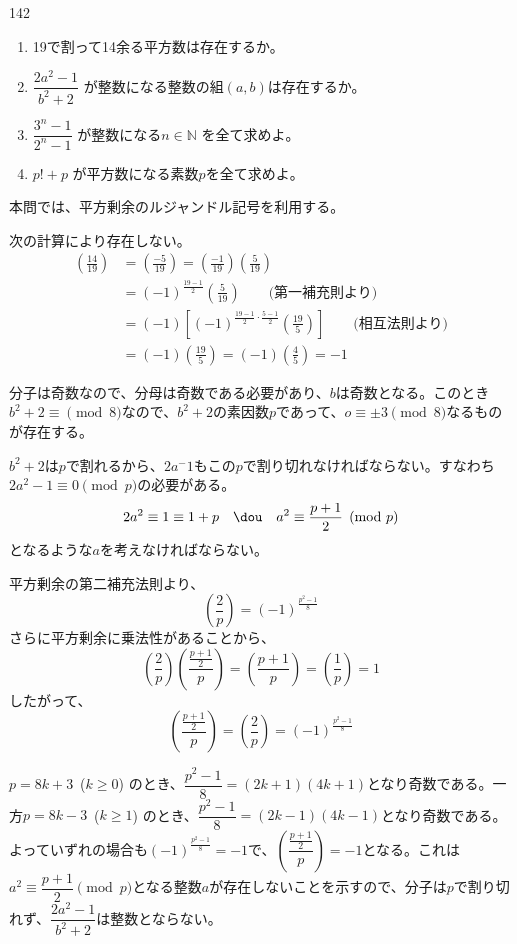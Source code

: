 \begin{thm}{142}{}{}
 \begin{enumerate}
  \item 19で割って14余る平方数は存在するか。 
  \item $\dfrac{2a^2-1}{b^2+2}$ が整数になる整数の組$(a,b)$は存在するか。 
  \item $\dfrac{3^n-1}{2^n-1}$ が整数になる$n\in\mathbb{N}$ を全て求めよ。 
  \item $p!+p$ が平方数になる素数$p$を全て求めよ。 
 \end{enumerate}
\end{thm}

本問では、平方剰余のルジャンドル記号を利用する。

次の計算により存在しない。
\begin{align*}
 \left(\frac{14}{19}\right) &= \left(\frac{-5}{19}\right) = \left(\frac{-1}{19}\right)\left(\frac{5}{19}\right) \\
 &= (-1)^{\frac{19-1}{2}}\left(\frac{5}{19}\right) \quad\quad\text{(第一補充則より)} \\
 &= (-1)\left[(-1)^{\frac{19-1}{2}\cdot\frac{5-1}{2}}\left(\frac{19}{5}\right)\right] \quad\quad\text{(相互法則より)} \\
 &=(-1)\left(\frac{19}{5}\right) = (-1)\left(\frac{4}{5}\right) = -1
\end{align*}

分子は奇数なので、分母は奇数である必要があり、$b$は奇数となる。このとき$b^2+2\equiv\pmod{8}$なので、$b^2+2$の素因数$p$であって、$o\equiv\pm 3 \pmod{8}$なるものが存在する。

$b^2+2$は$p$で割れるから、$2a^-1$もこの$p$で割り切れなければならない。すなわち$2a^2-1\equiv 0\pmod{p}$の必要がある。
\[ 2a^2\equiv 1\equiv 1+p \quad\dou\quad a^2\equiv \frac{p+1}{2} \pmod{p} \]
となるような$a$を考えなければならない。

平方剰余の第二補充法則より、
\[ \left(\frac{2}{p}\right)=\left(-1\right)^{\frac{p^2-1}{8}} \]
さらに平方剰余に乗法性があることから、
\[ \left(\frac{2}{p}\right)\left(\frac{\frac{p+1}{2}}{p}\right)=\left(\frac{p+1}{p}\right)=\left(\frac{1}{p}\right)=1 \]
したがって、
\[ \left(\frac{\frac{p+1}{2}}{p}\right)=\left(\frac{2}{p}\right)=\left(-1\right)^{\frac{p^2-1}{8}} \]

$p=8k+3$~($k\ge 0$) のとき、$\dfrac{p^2-1}{8}=(2k+1)(4k+1)$となり奇数である。一方$p=8k-3$~($k\ge 1$) のとき、$\dfrac{p^2-1}{8}=(2k-1)(4k-1)$となり奇数である。よっていずれの場合も$\left(-1\right)^\frac{p^2-1}{8}=-1$で、$\left(\dfrac{\frac{p+1}{2}}{p}\right)=-1$となる。これは$a^2\equiv \dfrac{p+1}{2} \pmod{p}$となる整数$a$が存在しないことを示すので、分子は$p$で割り切れず、$\dfrac{2a^2-1}{b^2+2}$は整数とならない。


